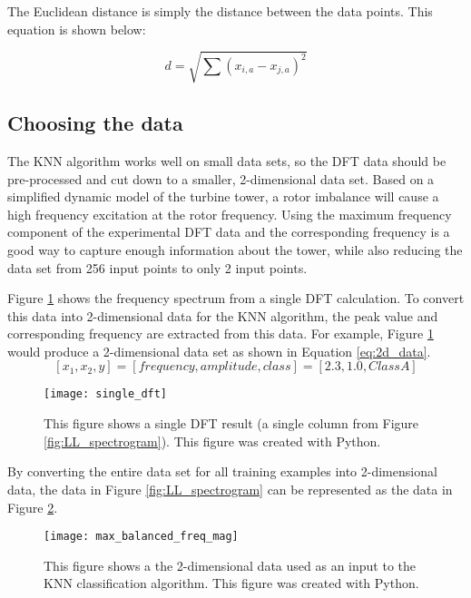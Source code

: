 The Euclidean distance is simply the distance between the data points.  This equation is shown below:

\begin{equation}
	d = \sqrt{\sum{\left(x_{i,a}-x_{j,a}\right)^2}}
\end{equation}

\subsection{Choosing the data}
The KNN algorithm works well on small data sets, so the DFT data should be pre-processed and cut down to a smaller, 2-dimensional data set.  Based on a simplified dynamic model of the turbine tower, a rotor imbalance will cause a high frequency excitation at the rotor frequency.  Using the maximum frequency component of the experimental DFT data and the corresponding frequency is a good way to capture enough information about the tower, while also reducing the data set from 256 input points to only 2 input points.

Figure \ref{fig:single_dft} shows the frequency spectrum from a single DFT calculation.  To convert this data into 2-dimensional data for the KNN algorithm, the peak value and corresponding frequency are extracted from this data.  For example, Figure \ref{fig:single_dft} would produce a 2-dimensional data set as shown in Equation \ref{eq:2d_data}.
\begin{equation} \label{eq:2d_data}
	[x_1, x_2, y] = [frequency, amplitude, class] = [2.3, 1.0, Class A]
\end{equation}

\begin{figure}
	\centering
	\texttt{[image: single\_dft]}
	\decoRule
	\caption{This figure shows a single DFT result (a single column from Figure \ref{fig:LL_spectrogram}).  This figure was created with Python.}
	\label{fig:single_dft}
\end{figure}

By converting the entire data set for all training examples into 2-dimensional data, the data in Figure \ref{fig:LL_spectrogram} can be represented as the data in Figure \ref{fig:max_balanced_freq_mag}.

\begin{figure}
	\centering
	\texttt{[image: max\_balanced\_freq\_mag]}
	\decoRule
	\caption{This figure shows a the 2-dimensional data used as an input to the KNN classification algorithm.  This figure was created with Python.}
	\label{fig:max_balanced_freq_mag}
\end{figure}


